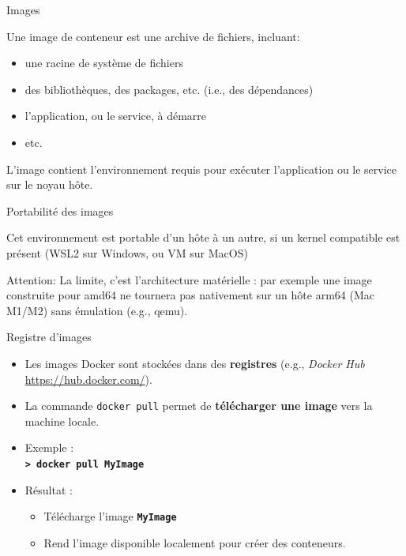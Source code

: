 \documentclass[aspectratio=169,10pt]{beamer}
\begin{document}

\begin{frame}{Images}

Une image de conteneur est une archive de fichiers, incluant:

\begin{itemize}
   \item une racine de système de fichiers
   \item des bibliothèques, des packages, etc. (i.e., des dépendances)
   \item l'application, ou le service, à démarre
   \item etc.
\end{itemize} 

L'image contient l'environnement requis pour exécuter l'application ou le service sur le noyau hôte.

\end{frame}

\begin{frame}{Portabilité des images}

Cet environnement est \alert{portable} d'un hôte à un autre, si un kernel compatible est présent (\alert{WSL2 sur Windows}, ou \alert{VM sur MacOS})

\vspace{0.5cm}

\alert{Attention}: La limite, c’est l’architecture matérielle : par exemple une image construite pour amd64 ne tournera pas nativement sur un hôte arm64 (Mac M1/M2) sans émulation (e.g., qemu).


\end{frame}


\begin{frame}{Registre d'images}

 \begin{itemize}
    \item Les images Docker sont stockées dans des \textbf{registres} (e.g., \textit{Docker Hub} \url{https://hub.docker.com/}).
    
    \item La commande \texttt{docker pull} permet de \textbf{télécharger une image} vers la machine locale.
    
    \item Exemple : \\
    \texttt{\textbf{> docker pull MyImage}}
      
    \item Résultat :
      \begin{itemize}
        \item Télécharge l’image \texttt{\textbf{MyImage}}
        \item Rend l’image disponible localement pour créer des conteneurs.
      \end{itemize}
  \end{itemize}

\end{frame}
\end{document}
